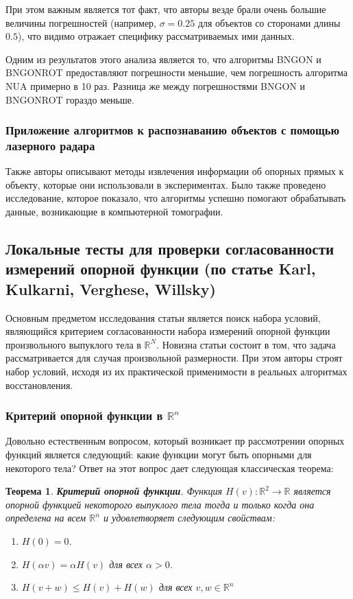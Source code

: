 \documentclass[a4paper, 12pt, titlepage]{article}
\theoremstyle{definition}
\theoremstyle{plain}
\newtheorem{SmartTheorem}{Теорема}
\begin{document}
При этом важным является тот факт, что авторы везде брали очень большие
величины погрешностей (например, $\sigma = 0.25$ для объектов со сторонами 
длины $0.5$), что видимо отражает специфику рассматриваемых ими данных.

Одним из результатов этого анализа является то, что алгоритмы BNGON и BNGONROT
предоставляют погрешности меньшие, чем погрешность алгоритма NUA примерно в 10
раз. Разница же между погрешностями BNGON и BNGONROT гораздо меньше.

\subsubsection{Приложение алгоритмов к распознаванию объектов с помощью
лазерного радара}
\label{sec:history/LeleKW92/applications}

Также авторы описывают методы извлечения информации об опорных прямых к
объекту, которые они использовали в экспериментах. Было также проведено
исследование, которое показало, что алгоритмы успешно помогают обрабатывать
данные, возникающие в компьютерной томографии.

\newpage
\subsection{Локальные тесты для проверки согласованности измерений опорной
функции (по статье Karl, Kulkarni, Verghese, Willsky)}
\label{sec:history/KarlKVW96}

Основным предметом исследования статьи является поиск набора условий,
являющийся критерием согласованности набора измерений опорной функции 
произвольного выпуклого тела в $\mathbb{R}^{N}$. Новизна статьи состоит в
том, что задача рассматривается для случая произвольной размерности. При этом
авторы строят набор условий, исходя из их практической применимости в реальных
алгоритмах восстановления.

\subsubsection{Критерий опорной функции в $\mathbb{R}^{n}$}
\label{sec:history/KarlKVW96/support-function-criterion}

Довольно естественным вопросом, который возникает пр рассмотрении опорных
функций является следующий: какие функции могут быть опорными для некоторого
тела? Ответ на этот вопрос дает следующая классическая теорема:

\begin{SmartTheorem}
 \label{thm:support-function-criterio-R2}
 \textbf{Критерий опорной функции}.
 Функция $H(v): \mathbb{R}^{2} \to \mathbb{R}$ является опорной функцией
 некоторого выпуклого тела тогда и только когда она определена на всем
 $\mathbb{R}^{n}$ и удовлетворяет следующим свойствам:
 \begin{enumerate}
  \item $H(0) = 0$.
  \item $H(\alpha v) = \alpha H(v)$ для всех $\alpha > 0$.
  \item $H(v + w) \leq H(v) + H(w)$ для всех $v, w \in \mathbb{R}^{n}$
 \end{enumerate}
\end{SmartTheorem}
\end{document}
